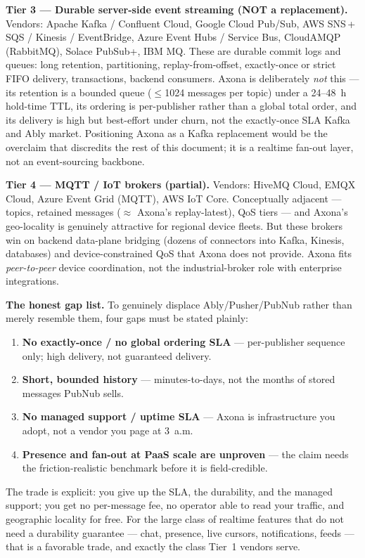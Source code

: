 \documentclass[nobib]{tufte-handout}
\begin{document}
\textbf{Tier 3 --- Durable server-side event streaming (NOT a
replacement).} Vendors: Apache Kafka / Confluent Cloud, Google Cloud
Pub/Sub, AWS SNS\,+\,SQS / Kinesis / EventBridge, Azure Event Hubs /
Service Bus, CloudAMQP (RabbitMQ), Solace PubSub+, IBM MQ. These are
durable commit logs and queues: long retention, partitioning,
replay-from-offset, exactly-once or strict FIFO delivery, transactions,
backend consumers. Axona is deliberately \emph{not} this --- its
retention is a bounded queue ($\le$1024 messages per topic) under a 24--48~h
hold-time TTL, its ordering is per-publisher rather than a global total
order, and its delivery is high but best-effort under churn, not the
exactly-once SLA Kafka and Ably market. Positioning Axona as a Kafka
replacement would be the overclaim that discredits the rest of this
document; it is a realtime fan-out layer, not an event-sourcing
backbone.

\textbf{Tier 4 --- MQTT / IoT brokers (partial).} Vendors: HiveMQ Cloud,
EMQX Cloud, Azure Event Grid (MQTT), AWS IoT Core. Conceptually adjacent
--- topics, retained messages ($\approx$ Axona's replay-latest), QoS
tiers --- and Axona's geo-locality is genuinely attractive for regional
device fleets. But these brokers win on backend data-plane bridging
(dozens of connectors into Kafka, Kinesis, databases) and
device-constrained QoS that Axona does not provide. Axona fits
\emph{peer-to-peer} device coordination, not the industrial-broker role
with enterprise integrations.

\textbf{The honest gap list.} To genuinely displace Ably/Pusher/PubNub
rather than merely resemble them, four gaps must be stated plainly:
\begin{enumerate}
\item \textbf{No exactly-once / no global ordering SLA} ---
per-publisher sequence only; high delivery, not guaranteed delivery.
\item \textbf{Short, bounded history} --- minutes-to-days, not the
months of stored messages PubNub sells.
\item \textbf{No managed support / uptime SLA} --- Axona is
infrastructure you adopt, not a vendor you page at 3~a.m.
\item \textbf{Presence and fan-out at PaaS scale are unproven} --- the
claim needs the friction-realistic benchmark before it is
field-credible.
\end{enumerate}
The trade is explicit: you give up the SLA, the durability, and the
managed support; you get no per-message fee, no operator able to read
your traffic, and geographic locality for free. For the large class of
realtime features that do not need a durability guarantee --- chat,
presence, live cursors, notifications, feeds --- that is a favorable
trade, and exactly the class Tier~1 vendors serve.
\end{document}
